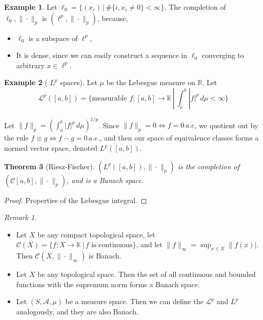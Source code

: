 \documentclass[10pt, oneside, reqno]{amsart}
\theoremstyle{plain}%
\newtheorem{thm}{Theorem}[section]
\theoremstyle{definition}
\newtheorem{exmp}[thm]{Example}
\theoremstyle{remark}
\newtheorem*{rem}{Remark}
\newcommand{\R}{\mathbb{R}}
\newcommand{\K}{\mathbb{K}}
\begin{document}
\begin{exmp}
    Let $\ell_0 = \{ (x_i) \, | \, \# \{ i, x_i \neq 0 \} < \infty \}$.  The completion of $\ell_0, \| \cdot \|_p$ is $(\ell^p, \| \cdot \|_p )$, because,
    \begin{itemize}
        \item $\ell_0$ is a subspace of $\ell^p$,
        \item It is dense, since we can easily construct a sequence in $\ell_0$ converging to arbitrary $x \in \ell^p$.
    \end{itemize}
\end{exmp}
\begin{exmp}[ $L^p$ spaces]
    Let $\mu$ be the Lebesgue measure on $\R$.  Let \[
        \mathcal{L}^p([a,b]) = \{ \text{measurable } f: [a,b] \rightarrow \K \, | \, \int_a^b |f|^p \, d \mu < \infty \}
    \]
    
    Let $\| f \|_p = \left( \int_a^b |f|^p \, d \mu \right)^{1/p}$.  Since $\| f \|_p = 0 \iff f = 0 \, a.e$, we quotient out by the rule $f \equiv g \iff f - g = 0 \, a.e.$, and then our space of equivalence classes forms a normed vector space, denoted $L^p([a,b])$.
\end{exmp}

\begin{thm}[Riesz-Fischer] $(L^p([a,b]), \| \cdot \|_p )$ is the completion of $(\mathcal{C}[a,b], \| \cdot \|_p )$, and is a Banach space.
\end{thm}
\begin{proof}
    Properties of the Lebesgue integral.
\end{proof}

\begin{rem}{\ }
    \begin{itemize}
        \item Let $X$ be any compact topological space, let $\mathcal{C}(X) = \{ f : X \rightarrow \K \, | \, \text{$f$ is continuous} \}$, and let $\|f \|_\infty = \sup_{x \in X} \|f(x)|$.  Then $\mathcal{C}(X, \| \cdot \|_\infty)$ is Banach.  
        \item Let $X$ be any topological space.  Then the set of all continuous and bounded functions with the supremum norm forms a Banach space.
        \item Let $(S, \mathcal{A}, \mu)$ be a measure space.  Then we can define the $\mathcal{L}^p$ and $L^p$ analogously, and they are also Banach.
    \end{itemize}
\end{rem}
\end{document}
